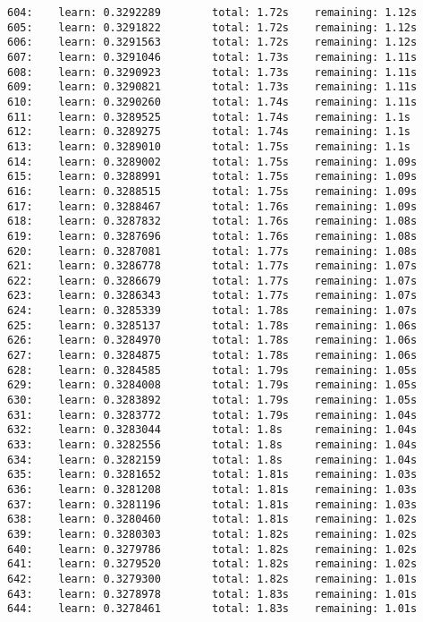 \documentclass[11pt]{article}
\begin{document}
\begin{Verbatim}[commandchars=\\\{\}]
604:    learn: 0.3292289        total: 1.72s    remaining: 1.12s
605:    learn: 0.3291822        total: 1.72s    remaining: 1.12s
606:    learn: 0.3291563        total: 1.72s    remaining: 1.12s
607:    learn: 0.3291046        total: 1.73s    remaining: 1.11s
608:    learn: 0.3290923        total: 1.73s    remaining: 1.11s
609:    learn: 0.3290821        total: 1.73s    remaining: 1.11s
610:    learn: 0.3290260        total: 1.74s    remaining: 1.11s
611:    learn: 0.3289525        total: 1.74s    remaining: 1.1s
612:    learn: 0.3289275        total: 1.74s    remaining: 1.1s
613:    learn: 0.3289010        total: 1.75s    remaining: 1.1s
614:    learn: 0.3289002        total: 1.75s    remaining: 1.09s
615:    learn: 0.3288991        total: 1.75s    remaining: 1.09s
616:    learn: 0.3288515        total: 1.75s    remaining: 1.09s
617:    learn: 0.3288467        total: 1.76s    remaining: 1.09s
618:    learn: 0.3287832        total: 1.76s    remaining: 1.08s
619:    learn: 0.3287696        total: 1.76s    remaining: 1.08s
620:    learn: 0.3287081        total: 1.77s    remaining: 1.08s
621:    learn: 0.3286778        total: 1.77s    remaining: 1.07s
622:    learn: 0.3286679        total: 1.77s    remaining: 1.07s
623:    learn: 0.3286343        total: 1.77s    remaining: 1.07s
624:    learn: 0.3285339        total: 1.78s    remaining: 1.07s
625:    learn: 0.3285137        total: 1.78s    remaining: 1.06s
626:    learn: 0.3284970        total: 1.78s    remaining: 1.06s
627:    learn: 0.3284875        total: 1.78s    remaining: 1.06s
628:    learn: 0.3284585        total: 1.79s    remaining: 1.05s
629:    learn: 0.3284008        total: 1.79s    remaining: 1.05s
630:    learn: 0.3283892        total: 1.79s    remaining: 1.05s
631:    learn: 0.3283772        total: 1.79s    remaining: 1.04s
632:    learn: 0.3283044        total: 1.8s     remaining: 1.04s
633:    learn: 0.3282556        total: 1.8s     remaining: 1.04s
634:    learn: 0.3282159        total: 1.8s     remaining: 1.04s
635:    learn: 0.3281652        total: 1.81s    remaining: 1.03s
636:    learn: 0.3281208        total: 1.81s    remaining: 1.03s
637:    learn: 0.3281196        total: 1.81s    remaining: 1.03s
638:    learn: 0.3280460        total: 1.81s    remaining: 1.02s
639:    learn: 0.3280303        total: 1.82s    remaining: 1.02s
640:    learn: 0.3279786        total: 1.82s    remaining: 1.02s
641:    learn: 0.3279520        total: 1.82s    remaining: 1.02s
642:    learn: 0.3279300        total: 1.82s    remaining: 1.01s
643:    learn: 0.3278978        total: 1.83s    remaining: 1.01s
644:    learn: 0.3278461        total: 1.83s    remaining: 1.01s

\end{Verbatim}
\end{document}
